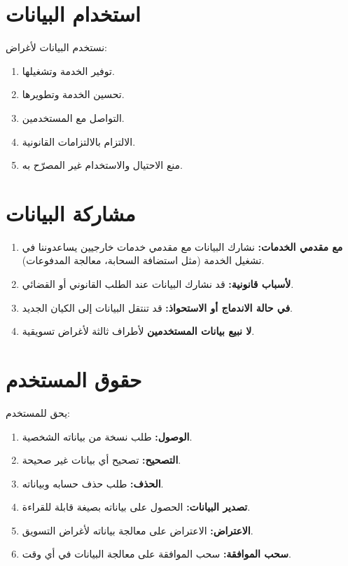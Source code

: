 \documentclass[11pt,a4paper]{article}
\begin{document}
\section{استخدام البيانات}
\label{sec:data_use}
نستخدم البيانات لأغراض:
\begin{enumerate}
    \item توفير الخدمة وتشغيلها.
    \item تحسين الخدمة وتطويرها.
    \item التواصل مع المستخدمين.
    \item الالتزام بالالتزامات القانونية.
    \item منع الاحتيال والاستخدام غير المصرّح به.
\end{enumerate}

\section{مشاركة البيانات}
\label{sec:data_sharing}
\begin{enumerate}
    \item \textbf{مع مقدمي الخدمات:} نشارك البيانات مع مقدمي خدمات خارجيين يساعدوننا في تشغيل الخدمة (مثل استضافة السحابة، معالجة المدفوعات).
    \item \textbf{لأسباب قانونية:} قد نشارك البيانات عند الطلب القانوني أو القضائي.
    \item \textbf{في حالة الاندماج أو الاستحواذ:} قد تنتقل البيانات إلى الكيان الجديد.
    \item \textbf{لا نبيع بيانات المستخدمين} لأطراف ثالثة لأغراض تسويقية.
\end{enumerate}

\section{حقوق المستخدم}
\label{sec:user_rights}
يحق للمستخدم:
\begin{enumerate}
    \item \textbf{الوصول:} طلب نسخة من بياناته الشخصية.
    \item \textbf{التصحيح:} تصحيح أي بيانات غير صحيحة.
    \item \textbf{الحذف:} طلب حذف حسابه وبياناته.
    \item \textbf{تصدير البيانات:} الحصول على بياناته بصيغة قابلة للقراءة.
    \item \textbf{الاعتراض:} الاعتراض على معالجة بياناته لأغراض التسويق.
    \item \textbf{سحب الموافقة:} سحب الموافقة على معالجة البيانات في أي وقت.
\end{enumerate}
\end{document}
